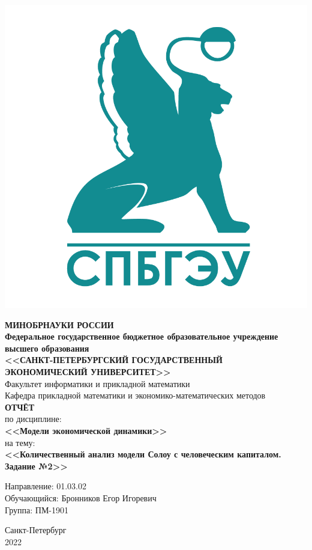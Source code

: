 \documentclass[14pt,fleqn]{extarticle}
\begin{document}
	\begin{titlepage}
		\includegraphics[scale=0.12]{logo}
		\begin{center}
			\textbf{МИНОБРНАУКИ РОССИИ}\\
			\vspace{0.2cm}
			\textbf{Федеральное государственное бюджетное образовательное учреждение высшего образования}\\
			\textbf{<<САНКТ-ПЕТЕРБУРГСКИЙ ГОСУДАРСТВЕННЫЙ ЭКОНОМИЧЕСКИЙ УНИВЕРСИТЕТ>>}\\
			\vspace{0.6cm}
			Факультет информатики и прикладной математики\\
			Кафедра прикладной математики и экономико-математических методов\\
			\vspace{1cm}
			\textbf{ОТЧЁТ}\\
			по дисциплине:\\
			\textbf{<<Модели экономической динамики>>}\\
			на тему:\\
			\textbf{<<Количественный анализ модели Солоу с человеческим капиталом. Задание №2>>}\\
		\end{center}
		\vspace{1cm}
		Направление: 01.03.02\\
		Обучающийся: Бронников Егор Игоревич\\
		Группа: ПМ-1901\\
		\vfill
		\begin{center}
			Санкт-Петербург\\
			2022\\
		\end{center}
	\end{titlepage}
\end{document}
